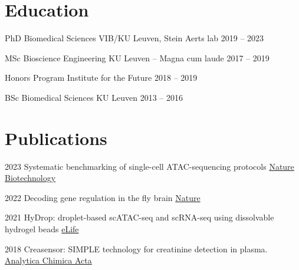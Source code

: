 \documentclass{tccv}
\begin{document}
\section{Education}
\begin{eventlist}
      \item{PhD Biomedical Sciences}
            {VIB/KU Leuven, Stein Aerts lab}
            {2019 -- 2023}
            {}

      \item{MSc Bioscience Engineering}
            {KU Leuven -- Magna cum laude}
            {2017 -- 2019}
            {}

      \item{Honors Program}
            {Institute for the Future}
            {2018 -- 2019}
            {}

      \item{BSc Biomedical Sciences}
            {KU Leuven}
            {2013 -- 2016}
            {}
\end{eventlist}
\newpage
\section{Publications}
\begin{yearlist}
    \item{2023}
          {Systematic benchmarking of single-cell ATAC-sequencing protocols}
          {\href{https://www.nature.com/articles/s41587-023-01881-x}{Nature Biotechnology}}
    \item{2022}
          {Decoding gene regulation in the fly brain}
          {\href{https://www.nature.com/articles/s41586-021-04262-z}{Nature}}
    \item{2021}
          {HyDrop: droplet-based scATAC-seq and scRNA-seq using dissolvable hydrogel beads}
          {\href{https://doi.org/10.7554/eLife.73971}{eLife}}
    \item{2018}
          {Creasensor: SIMPLE technology for creatinine detection in plasma.}
          {\href{https://doi.org/10.1016/j.aca.2017.11.026}{Analytica Chimica Acta}}
\end{yearlist}
\end{document}
